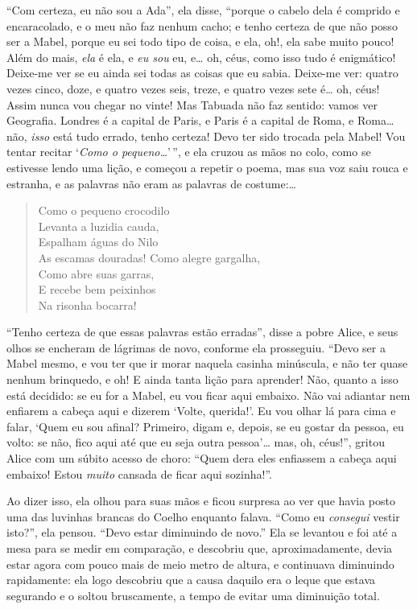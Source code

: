 ``Com certeza, eu não sou a Ada'', ela disse, ``porque o cabelo dela é
comprido e encaracolado, e o meu não faz nenhum cacho; e tenho certeza
de que não posso ser a Mabel, porque eu sei todo tipo de coisa, e ela, oh!,
ela sabe muito pouco! Além do mais, \emph{ela} é ela, e \emph{eu sou}
eu, e\ldots{} oh, céus, como isso tudo é enigmático! Deixe-me ver se eu ainda
sei todas as coisas que eu sabia. Deixe-me ver: quatro vezes cinco,
doze, e quatro vezes seis, treze, e quatro vezes sete é\ldots{} oh, céus!
Assim nunca vou chegar no vinte! Mas Tabuada não faz sentido: vamos ver
Geografia. Londres é a capital de Paris, e Paris é a capital de Roma, e
Roma\ldots{} não, \emph{isso} está tudo errado, tenho certeza! Devo ter sido
trocada pela Mabel! Vou tentar recitar `\emph{Como o pequeno\ldots{}}'\,'', e
ela cruzou as mãos no colo, como se estivesse lendo uma lição, e começou
a repetir o poema, mas sua voz saiu rouca e estranha, e as palavras não
eram as palavras de costume:\ldots{}

\begin{quote}
Como o pequeno crocodilo\\
Levanta a luzidia cauda,\\
Espalham águas do Nilo\\
As escamas douradas!
\medskip
Como alegre gargalha,\\
Como abre suas garras,\\
E recebe bem peixinhos\\
Na risonha bocarra!
\end{quote}

``Tenho certeza de que essas palavras estão erradas'', disse a pobre Alice,
e seus olhos se encheram de lágrimas de novo, conforme ela prosseguiu.
``Devo ser a Mabel mesmo, e vou ter que ir morar naquela casinha
minúscula, e não ter quase nenhum brinquedo, e oh! E ainda tanta lição
para aprender! Não, quanto a isso está decidido: se eu for a Mabel, eu
vou ficar aqui embaixo. Não vai adiantar nem enfiarem a cabeça aqui e
dizerem `Volte, querida!'. Eu vou olhar lá para cima e falar, `Quem eu
sou afinal? Primeiro, digam e, depois, se eu gostar da pessoa, eu volto:
se não, fico aqui até que eu seja outra pessoa'\ldots{} mas, oh, céus!'',
gritou Alice com um súbito acesso de choro: ``Quem dera eles enfiassem a
cabeça aqui embaixo! Estou \emph{muito} cansada de ficar aqui
sozinha!''.

Ao dizer isso, ela olhou para suas mãos e ficou surpresa ao ver que
havia posto uma das luvinhas brancas do Coelho enquanto falava. ``Como
eu \emph{consegui} vestir isto?'', ela pensou. ``Devo estar diminuindo
de novo.'' Ela se levantou e foi até a mesa para se medir em comparação,
e descobriu que, aproximadamente, devia estar agora com pouco mais de
meio metro de altura, e continuava diminuindo rapidamente: ela logo
descobriu que a causa daquilo era o leque que estava segurando e o
soltou bruscamente, a tempo de evitar uma diminuição total.

